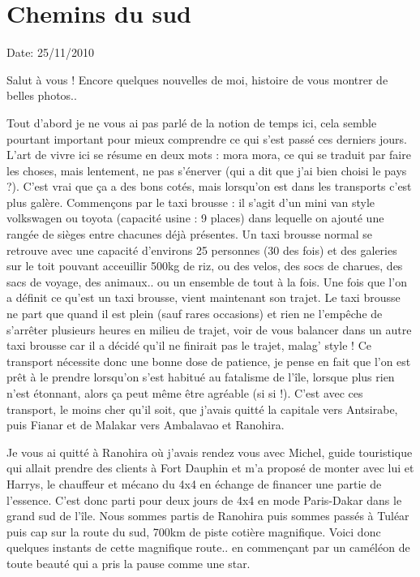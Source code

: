 \section{Chemins du sud}

Date: 25/11/2010

\begin{multicols}{2}

Salut à vous ! Encore quelques nouvelles de moi, histoire de vous montrer de belles photos..

Tout d'abord je ne vous ai pas parlé de la notion de temps ici, cela semble pourtant important pour mieux comprendre ce qui s'est passé ces derniers jours. L'art de vivre ici se résume en deux mots : mora mora, ce qui se traduit par faire les choses, mais lentement, ne pas s'énerver (qui a dit que j'ai bien choisi le pays ?). C'est vrai que ça a des bons cotés, mais lorsqu'on est dans les transports c'est plus galère. Commençons par le taxi brousse : il s'agit d'un mini van style volkswagen ou toyota (capacité usine : 9 places) dans lequelle on ajouté une rangée de sièges entre chacunes déjà présentes. Un taxi brousse normal se retrouve avec une capacité d'environs 25 personnes (30 des fois) et des galeries sur le toit pouvant acceuillir 500kg de riz, ou des velos, des socs de charues, des sacs de voyage, des animaux.. ou un ensemble de tout à la fois. Une fois que l'on a définit ce qu'est un taxi brousse, vient maintenant son trajet. Le taxi brousse ne part que quand il est plein (sauf rares occasions) et rien ne l'empêche de s'arrêter plusieurs heures en milieu de trajet, voir de vous balancer dans un autre taxi brousse car il a décidé qu'il ne finirait pas le trajet, malag' style ! Ce transport nécessite donc une bonne dose de patience, je pense en fait que l'on est prêt à le prendre lorsqu'on s'est habitué au fatalisme de l'île, lorsque plus rien n'est étonnant, alors ça peut même être agréable (si si !). C'est avec ces transport, le moins cher qu'il soit, que j'avais quitté la capitale vers Antsirabe, puis Fianar et de Malakar vers Ambalavao et Ranohira.

Je vous ai quitté à Ranohira où j'avais rendez vous avec Michel, guide touristique qui allait prendre des clients à Fort Dauphin et m'a proposé de monter avec lui et Harrys, le chauffeur et mécano du 4x4 en échange de financer une partie de l'essence. C'est donc parti pour deux jours de 4x4 en mode Paris-Dakar dans le grand sud de l'île. Nous sommes partis de Ranohira puis sommes passés à Tuléar puis cap sur la route du sud, 700km de piste cotière magnifique. Voici donc quelques instants de cette magnifique route.. en commençant par un caméléon de toute beauté qui a pris la pause comme une star.


\end{multicols}
